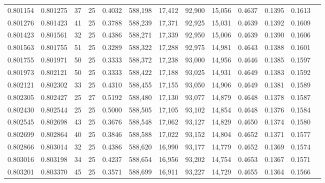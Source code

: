 \begin{tabular}{rrrrrrrrrrrrr}
0.801154 & 0.801275 &    37 &  25 &                                     0.4032 & 588,198 &  17,412 &  92,900 &  15,056 & 0.4637 & 0.1395 & 0.1613 \\
0.801276 & 0.801423 &    41 &  25 &                                     0.3788 & 588,239 &  17,371 &  92,925 &  15,031 & 0.4639 & 0.1392 & 0.1609 \\
0.801423 & 0.801561 &    32 &  25 &                                     0.4386 & 588,271 &  17,339 &  92,950 &  15,006 & 0.4639 & 0.1390 & 0.1606 \\
0.801563 & 0.801755 &    51 &  25 &                                     0.3289 & 588,322 &  17,288 &  92,975 &  14,981 & 0.4643 & 0.1388 & 0.1601 \\
0.801755 & 0.801971 &    50 &  25 &                                     0.3333 & 588,372 &  17,238 &  93,000 &  14,956 & 0.4646 & 0.1385 & 0.1597 \\
0.801973 & 0.802121 &    50 &  25 &                                     0.3333 & 588,422 &  17,188 &  93,025 &  14,931 & 0.4649 & 0.1383 & 0.1592 \\
0.802121 & 0.802302 &    33 &  25 &                                     0.4310 & 588,455 &  17,155 &  93,050 &  14,906 & 0.4649 & 0.1381 & 0.1589 \\
0.802305 & 0.802427 &    25 &  27 &                                     0.5192 & 588,480 &  17,130 &  93,077 &  14,879 & 0.4648 & 0.1378 & 0.1587 \\
0.802430 & 0.802544 &    25 &  25 &                                     0.5000 & 588,505 &  17,105 &  93,102 &  14,854 & 0.4648 & 0.1376 & 0.1584 \\
0.802545 & 0.802698 &    43 &  25 &                                     0.3676 & 588,548 &  17,062 &  93,127 &  14,829 & 0.4650 & 0.1374 & 0.1580 \\
0.802699 & 0.802864 &    40 &  25 &                                     0.3846 & 588,588 &  17,022 &  93,152 &  14,804 & 0.4652 & 0.1371 & 0.1577 \\
0.802866 & 0.803014 &    32 &  25 &                                     0.4386 & 588,620 &  16,990 &  93,177 &  14,779 & 0.4652 & 0.1369 & 0.1574 \\
0.803016 & 0.803198 &    34 &  25 &                                     0.4237 & 588,654 &  16,956 &  93,202 &  14,754 & 0.4653 & 0.1367 & 0.1571 \\
0.803201 & 0.803370 &    45 &  25 &                                     0.3571 & 588,699 &  16,911 &  93,227 &  14,729 & 0.4655 & 0.1364 & 0.1566 \\

\end{tabular}
